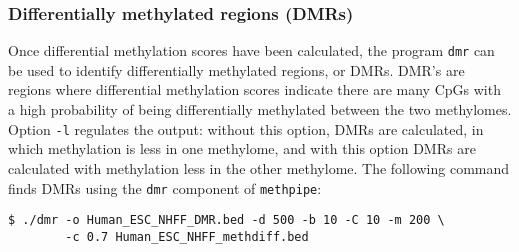 \documentclass[10pt]{article}
\newcommand{\meth}{\texttt{methpipe}}
\newcommand{\prog}[1]{\texttt{#1}}
\newcommand{\op}[1]{\texttt{#1}}
\begin{document}


\subsubsection{Differentially methylated regions (DMRs)}
\label{sec:dmr}

Once differential methylation scores have been calculated, the program
\prog{dmr} can be used to identify differentially methylated regions,
or DMRs. DMR's are regions where differential methylation scores
indicate there are many CpGs with a high probability of being
differentially methylated between the two methylomes.  Option \op{-l}
regulates the output: without this option, DMRs are calculated, in
which methylation is less in one methylome, and with this option DMRs
are calculated with methylation less in the other methylome. The
following command finds DMRs using the \prog{dmr} component of
\meth{}:
\begin{verbatim}
$ ./dmr -o Human_ESC_NHFF_DMR.bed -d 500 -b 10 -C 10 -m 200 \
        -c 0.7 Human_ESC_NHFF_methdiff.bed
\end{verbatim}

\end{document}
